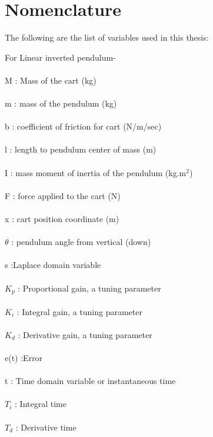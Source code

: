 \chapter*{Nomenclature}
\begin{SingleSpace}

\large {The following are the list of variables used in this thesis:} \\
\vspace{10mm}
\begin{minipage}{8cm}
    \vspace{5mm}
     \large{For Linear inverted pendulum-}\\
     \\M : Mass of the cart (kg)\\
     \\m : mass of the pendulum (kg)\\
     \\b : coefficient of friction for cart (N/m/sec)\\
     \\l : length to pendulum center of mass (m)\\
     \\I : mass moment of inertia of the pendulum (kg.m$^2$)\\
     \\F : force applied to the cart (N)\\
     \\x : cart position coordinate (m)\\
     \\$\theta$ : pendulum angle from vertical (down)\\
     \\s :Laplace domain variable\\
     \\$K_p$ : Proportional gain, a tuning parameter\\
     \\$K_i$ : Integral gain, a tuning parameter\\
     \\$K_d$ : Derivative gain, a tuning parameter\\
     \\e(t) :Error\\
     \\t : Time domain variable or instantaneous time\\
     \\$T_i$ : Integral time \\
     \\$T_d$ : Derivative time \\ 
     

\end{minipage}
\end{SingleSpace}
